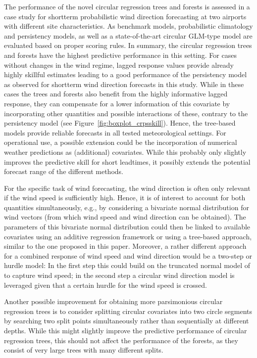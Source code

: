 \documentclass[nojss,shortnames]{jss}
\numberwithin{equation}{section}
\begin{document}
The performance of the novel circular regression trees and forests is assessed
in a case study for shortterm probabilistic wind direction forecasting at two
airports with different site characteristics. As benchmark models,
probabilistic climatology and persistency models, as well as a state-of-the-art
circular GLM-type model are evaluated based on proper scoring rules. In
summary, the circular regression trees and forests have the highest predictive
performance in this setting. For cases without changes in the wind regime,
lagged response values provide already highly skillful estimates leading to a
good performance of the persistency model as observed for shortterm wind
direction forecasts in this study. While in these cases the trees and forests
also benefit from the highly informative lagged response, they can compensate
for a lower information of this covariate by incorporating other quantities and
possible interactions of these, contrary to the persistency model (see
Figure~\ref{fig:boxplot_crpsskill}). Hence, the tree-based models provide
reliable forecasts in all tested meteorological settings. For operational use,
a possible extension could be the incorporation of numerical weather
predictions as (additional) covariates. While this probably only slightly
improves the predictive skill for short leadtimes, it possibly extends the
potential forecast range of the different methods.

For the specific task of wind forecasting, the wind direction is often only
relevant if the wind speed is sufficiently high. Hence, it is of interest to
account for both quantities simultaneously, e.g., by considering a bivariate
normal distribution for wind vectors (from which wind speed and wind direction
can be obtained). The parameters of this bivariate normal distribution could
then be linked to available covariates using an additive regression framework
\citep[as proposed by][]{Lang+Mayr+Stauffer:2019} or using a tree-based
approach, similar to the one proposed in this paper. Moreover, a rather
different approach for a combined response of wind speed and wind direction
would be a two-step or hurdle model: In the first step this could build on the
truncated normal model of \cite{Thorarinsdottir+Gneiting:2010} to capture wind
speed; in the second step a circular wind direction model is leveraged given
that a certain hurdle for the wind speed is crossed.

Another possible improvement for obtaining more parsimonious circular
regression trees is to consider splitting circular covariates into two circle
segments by searching two split points simultaneously rather than sequentially
at different depths. While this might slightly improve the predictive
performance of circular regression trees, this should not affect the
performance of the forests, as they consist of very large trees with many
different splits.
\end{document}
